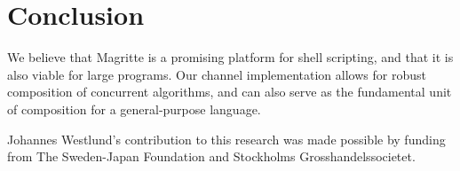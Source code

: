 \documentclass[english,preprint,JIP,uplatex]{ipsj}
\begin{document}
\section{Conclusion}\label{conclusion}

We believe that Magritte is a promising platform for shell scripting, and that it is also viable for large programs. Our channel implementation allows for robust composition of concurrent algorithms, and can also serve as the fundamental unit of composition for a general-purpose language.

\begin{acknowledgment}
Johannes Westlund's contribution to this research was made possible by funding from The Sweden-Japan Foundation and Stockholms Grosshandelssocietet.
\end{acknowledgment}



\end{document}
